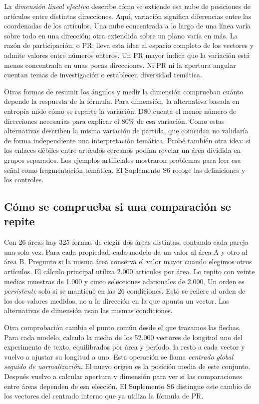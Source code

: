 \documentclass[12pt]{article}
\begin{document}
La \emph{dimensión lineal efectiva} describe cómo se extiende esa nube de posiciones de artículos entre distintas direcciones. Aquí, variación significa diferencias entre las coordenadas de los artículos. Una nube concentrada a lo largo de una línea varía sobre todo en una dirección; otra extendida sobre un plano varía en más. La razón de participación, o PR, lleva esta idea al espacio completo de los vectores y admite valores entre números enteros. Un PR mayor indica que la variación está menos concentrada en unas pocas direcciones. Ni PR ni la apertura angular cuentan temas de investigación o establecen diversidad temática.

Otras formas de resumir los ángulos y medir la dimensión comprueban cuánto depende la respuesta de la fórmula. Para dimensión, la alternativa basada en entropía mide cómo se reparte la variación. D80 cuenta el menor número de direcciones necesarias para explicar el 80\% de esa variación. Como estas alternativas describen la misma variación de partida, que coincidan no validaría de forma independiente una interpretación temática. Probé también otra idea: si los enlaces débiles entre artículos cercanos podían revelar un área dividida en grupos separados. Los ejemplos artificiales mostraron problemas para leer esa señal como fragmentación temática. El Suplemento S6 recoge las definiciones y los controles.

\subsection{Cómo se comprueba si una comparación se repite}
Con 26 áreas hay 325 formas de elegir dos áreas distintas, contando cada pareja una sola vez. Para cada propiedad, cada modelo da un valor al área A y otro al área B. Pregunto si la misma área conserva el valor mayor cuando elegimos otros artículos. El cálculo principal utiliza 2.000 artículos por área. Lo repito con veinte medias muestras de 1.000 y cinco selecciones adicionales de 2.000. Un orden es \emph{persistente} solo si se mantiene en las 26 condiciones. Esto se refiere al orden de los dos valores medidos, no a la dirección en la que apunta un vector. Las alternativas de dimensión usan las mismas condiciones.

Otra comprobación cambia el punto común desde el que trazamos las flechas. Para cada modelo, calculo la media de los 52.000 vectores de longitud uno del experimento de texto, equilibrados por área y período, la resto a cada vector y vuelvo a ajustar su longitud a uno. Esta operación se llama \emph{centrado global seguido de normalización}. El nuevo origen es la posición media de este conjunto. Después vuelvo a calcular apertura y dimensión para ver si las comparaciones entre áreas dependen de esa elección. El Suplemento S6 distingue este cambio de los vectores del centrado interno que ya utiliza la fórmula de PR.
\end{document}
